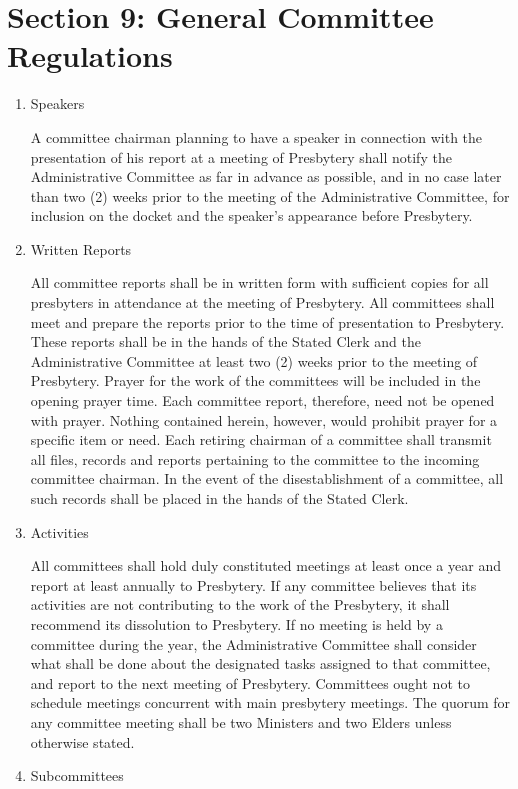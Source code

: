 \documentclass[
]{book}
\begin{document}
\hypertarget{section-9-general-committee-regulations}{%
\section{Section 9: General Committee Regulations}\label{section-9-general-committee-regulations}}

\begin{enumerate}
\def\labelenumi{\Alph{enumi}.}
\item
  Speakers

  A committee chairman planning to have a speaker in connection with the presentation of his report at a meeting of Presbytery shall notify the Administrative Committee as far in advance as possible, and in no case later than two (2) weeks prior to the meeting of the Administrative Committee, for inclusion on the docket and the speaker's appearance before Presbytery.
\item
  Written Reports

  All committee reports shall be in written form with sufficient copies for all presbyters in attendance at the meeting of Presbytery. All committees shall meet and prepare the reports prior to the time of presentation to Presbytery. These reports shall be in the hands of the Stated Clerk and the Administrative Committee at least two (2) weeks prior to the meeting of Presbytery. Prayer for the work of the committees will be included in the opening prayer time. Each committee report, therefore, need not be opened with prayer. Nothing contained herein, however, would prohibit prayer for a specific item or need. Each retiring chairman of a committee shall transmit all files, records and reports pertaining to the committee to the incoming committee chairman. In the event of the disestablishment of a committee, all such records shall be placed in the hands of the Stated Clerk.
\item
  Activities

  All committees shall hold duly constituted meetings at least once a year and report at least annually to Presbytery. If any committee believes that its activities are not contributing to the work of the Presbytery, it shall recommend its dissolution to Presbytery. If no meeting is held by a committee during the year, the Administrative Committee shall consider what shall be done about the designated tasks assigned to that committee, and report to the next meeting of Presbytery. Committees ought not to schedule meetings concurrent with main presbytery meetings. The quorum for any committee meeting shall be two Ministers and two Elders unless otherwise stated.
\item
  Subcommittees


\end{enumerate}
\end{document}
